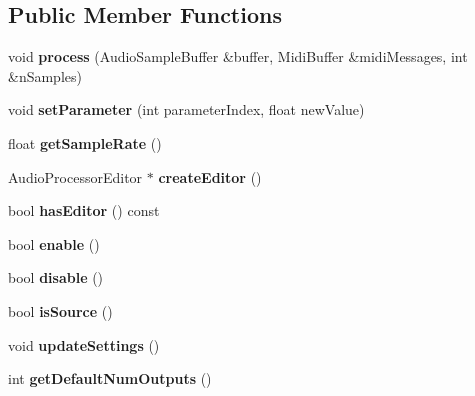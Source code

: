 \subsection*{Public Member Functions}
\begin{DoxyCompactItemize}
\item 
\hypertarget{classSignalGenerator_a86bf3bfff12cee52e76031bad0e6d7be}{void {\bfseries process} (Audio\-Sample\-Buffer \&buffer, Midi\-Buffer \&midi\-Messages, int \&n\-Samples)}\label{classSignalGenerator_a86bf3bfff12cee52e76031bad0e6d7be}

\item 
\hypertarget{classSignalGenerator_a988310f92a5493a81084bc674a16fa7b}{void {\bfseries set\-Parameter} (int parameter\-Index, float new\-Value)}\label{classSignalGenerator_a988310f92a5493a81084bc674a16fa7b}

\item 
\hypertarget{classSignalGenerator_aa1eaf3cbb3f0ba0cfd30a3bfb1640680}{float {\bfseries get\-Sample\-Rate} ()}\label{classSignalGenerator_aa1eaf3cbb3f0ba0cfd30a3bfb1640680}

\item 
\hypertarget{classSignalGenerator_a91924c5fb098363a4c8f4fd8270d5606}{Audio\-Processor\-Editor $\ast$ {\bfseries create\-Editor} ()}\label{classSignalGenerator_a91924c5fb098363a4c8f4fd8270d5606}

\item 
\hypertarget{classSignalGenerator_ae9967d5c19f63a30c317c7a262ffcb29}{bool {\bfseries has\-Editor} () const }\label{classSignalGenerator_ae9967d5c19f63a30c317c7a262ffcb29}

\item 
\hypertarget{classSignalGenerator_af22d1b1c3413686860b7b1c5a79030fc}{bool {\bfseries enable} ()}\label{classSignalGenerator_af22d1b1c3413686860b7b1c5a79030fc}

\item 
\hypertarget{classSignalGenerator_a748a502090ae4b04e2c4390410c3b737}{bool {\bfseries disable} ()}\label{classSignalGenerator_a748a502090ae4b04e2c4390410c3b737}

\item 
\hypertarget{classSignalGenerator_a461b122b1e4f19b577adb49c4c81e628}{bool {\bfseries is\-Source} ()}\label{classSignalGenerator_a461b122b1e4f19b577adb49c4c81e628}

\item 
\hypertarget{classSignalGenerator_ac35ec79d7494b49f7fd756e58a861d8f}{void {\bfseries update\-Settings} ()}\label{classSignalGenerator_ac35ec79d7494b49f7fd756e58a861d8f}

\item 
\hypertarget{classSignalGenerator_a35ea67882b0fe64389d61ef4a4112f6a}{int {\bfseries get\-Default\-Num\-Outputs} ()}\label{classSignalGenerator_a35ea67882b0fe64389d61ef4a4112f6a}

\end{DoxyCompactItemize}
